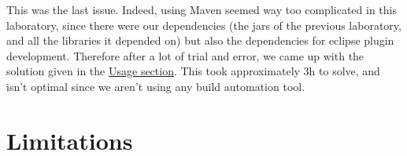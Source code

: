 \documentclass{report}
\begin{document}
{This was the last issue. Indeed, using Maven seemed way too complicated in this laboratory, since there were our dependencies (the jars of the previous laboratory, and all the libraries it depended on) but also the dependencies for eclipse plugin development. Therefore after a lot of trial and error, we came up with the solution given in the \hyperref[Usage::lab2]{Usage section}. This took approximately 3h to solve, and isn't optimal since we aren't using any build automation tool.
}


\chapter{Limitations}
\end{document}
